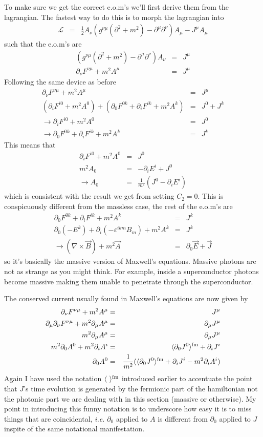\documentclass[aps,preprint,preprintnumbers,nofootinbib,showpacs,prd]{revtex4-1}
\newcommand{\ie}{{\it i.e.} }
\newcommand{\nbea}{\begin{eqnarray*}}
\newcommand{\neea}{\end{eqnarray*}}
\begin{document}
To make sure we get the correct e.o.m's we'll first derive them from the lagrangian. The fastest way to do this is to morph the lagrangian into
%
\nbea
\mathcal{L} & = & \frac{1}{2} A_\nu  \left ( g^{\nu\mu} (\partial^2 + m^2) - \partial^\mu\partial^\nu \right ) A_\mu - J^\mu A_\mu
\neea
%
such that the e.o.m's are
%
\nbea
\left (g^{\nu\mu} (\partial^2 + m^2) - \partial^\mu\partial^\nu \right ) A_\nu & = & J^\mu \\
\partial_\nu F^{\nu\mu} + m^2 A^\mu & = & J^\mu
\neea
%
Following the same device as before
%
\nbea
\partial_\nu F^{\nu\mu} + m^2 A^\mu & = & J^\mu \\
(\partial_i F^{i 0} + m^2 A^0) + (\partial_0 F^{0 k} + \partial_i F^{ik} + m^2 A^k) & = & J^0 + J^k \\
\to \partial_i F^{i 0} + m^2 A^0 & = & J^0 \\
\to \partial_0 F^{0 k} + \partial_i F^{ik} + m^2 A^k & = & J^k
\neea
%
This means that
%
\nbea
\partial_i F^{i 0} + m^2 A^0 & = & J^0 \\
m^2 A_0 & = & -\partial_i E^i + J^0 \\
\to A_0 & = & \frac{1}{m^2} (J^0 - \partial_i E^i)
\neea
%
which is consistent with the result we get from setting $C_2 = 0$. This is conspicuously different from the massless case, the rest of the e.o.m's are
%
\nbea
\partial_0 F^{0 k} + \partial_i F^{ik} + m^2 A^k & = & J^k \\
\partial_0 (-E^k) + \partial_i(-\varepsilon^{ikm} B_m) + m^2 A^k & = & J^k \\
\to (\nabla \times \vec B) + m^2 \vec A & = & \partial_0 \vec E + \vec J
\neea
%
so it's basically the massive version of Maxwell's equations. Massive photons are not as strange as you might think. For example, inside a superconductor photons become massive making them unable to penetrate through the superconductor.

The conserved current usually found in Maxwell's equations are now given by
%
\nbea
\partial_\nu F^{\nu\mu} + m^2 A^\mu & = & J^\mu \\
\partial_\mu \partial_\nu F^{\nu\mu} + m^2 \partial_\mu A^\mu & = & \partial_\mu J^\mu \\
m^2 \partial_\mu A^\mu & = & \partial_\mu J^\mu \\
m^2 \partial_0 A^0 + m^2 \partial_i A^i & = & \langle \partial_0 J^0 \rangle^{\rm fm} + \partial_i J^i \\
\partial_0 A^0 & = & \frac{1}{m^2} (\langle \partial_0 J^0 \rangle^{\rm fm} + \partial_i J^i - m^2 \partial_i A^i)
\neea
%
Again I have used the notation $\langle ~\rangle^{\rm fm}$ introduced earlier to accentuate the point that $J$'s time evolution is generated by the fermionic part of the hamiltonian not the photonic part we are dealing with in this section (massive or otherwise). My point in introducing this funny notation is to underscore how easy it is to miss things that are coincidental, \ie $\partial_0$ applied to $A$ is different from $\partial_0$ applied to $J$ inspite of the same notational manifestation.
\end{document}
